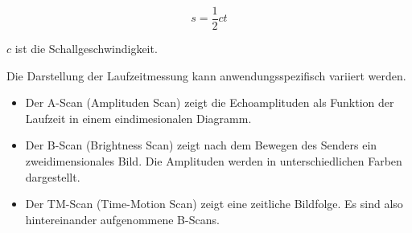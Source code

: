 \begin{equation}
  s = \frac{1}{2} c t
  \label{eqn:SchallStrecke}
\end{equation}

$c$ ist die Schallgeschwindigkeit.

Die Darstellung der Laufzeitmessung kann anwendungsspezifisch variiert werden.

\begin{itemize}
  \item Der A-Scan (Amplituden Scan) zeigt die Echoamplituden als Funktion der
  Laufzeit in einem eindimesionalen Diagramm.

  \item Der B-Scan (Brightness Scan) zeigt nach dem Bewegen des Senders ein
  zweidimensionales Bild. Die Amplituden werden in unterschiedlichen Farben dargestellt.

  \item Der TM-Scan (Time-Motion Scan) zeigt eine zeitliche Bildfolge. Es sind also hintereinander
  aufgenommene B-Scans.
\end{itemize}
